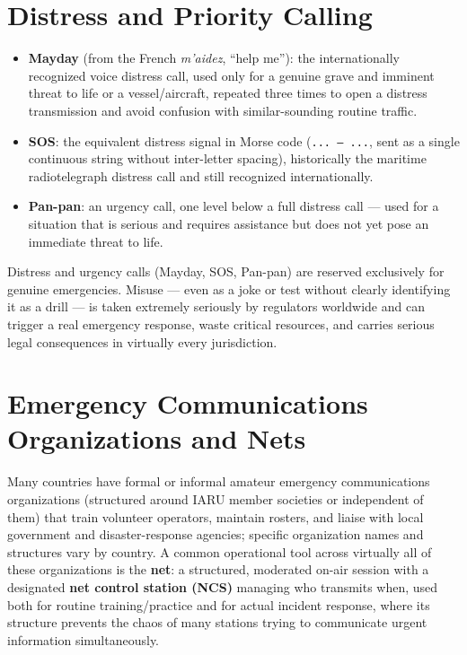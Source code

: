 \section{Distress and Priority Calling}

\begin{itemize}
\item \textbf{Mayday} (from the French \emph{m'aidez}, ``help me''):
the internationally recognized voice distress call, used only for a
genuine grave and imminent threat to life or a vessel/aircraft, repeated
three times to open a distress transmission and avoid confusion with
similar-sounding routine traffic.
\item \textbf{SOS}: the equivalent distress signal in Morse code
(\texttt{... --- ...}, sent as a single continuous string without
inter-letter spacing), historically the maritime radiotelegraph
distress call and still recognized internationally.
\item \textbf{Pan-pan}: an urgency call, one level below a full
distress call --- used for a situation that is serious and requires
assistance but does not yet pose an immediate threat to life.
\end{itemize}

\begin{safetynote}
Distress and urgency calls (Mayday, SOS, Pan-pan) are reserved
exclusively for genuine emergencies. Misuse --- even as a joke or test
without clearly identifying it as a drill --- is taken extremely
seriously by regulators worldwide and can trigger a real emergency
response, waste critical resources, and carries serious legal
consequences in virtually every jurisdiction.
\end{safetynote}

\section{Emergency Communications Organizations and Nets}

Many countries have formal or informal amateur emergency communications
organizations (structured around IARU member societies or independent
of them) that train volunteer operators, maintain rosters, and liaise
with local government and disaster-response agencies; specific
organization names and structures vary by country. A common
operational tool across virtually all of these organizations is the
\textbf{net}: a structured, moderated on-air session with a designated
\textbf{net control station (NCS)} managing who transmits when, used
both for routine training/practice and for actual incident response,
where its structure prevents the chaos of many stations trying to
communicate urgent information simultaneously.

